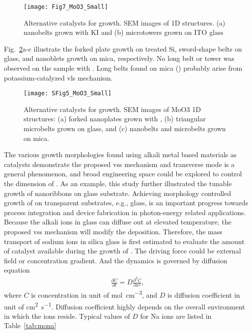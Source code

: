 \begin{figure}[htb]
\centering
\texttt{[image: Fig7\_MoO3\_Small]}
\caption[Alternative catalysts for  growth]{Alternative catalysts for  growth. SEM images of  1D structures. (a) nanobelts grown with KI and (b) microtowers grown on ITO glass}
\label{fig:ch4al1}
\end{figure}

Fig.~\ref{fig:ch4al2}a-c illustrate the forked plate growth on  treated Si, sword-shape belts on glass, and nanoblets growth on mica, respectively. No long belt or tower was observed on the sample with . Long belts found on mica () probably arise from potassium-catalyzed \gls{vls} mechanism.\cite{Hu2011}

\begin{figure}[htb]
\centering
\texttt{[image: SFig5\_MoO3\_Small]}
\caption[Alternative catalysts for  growth cont]{Alternative catalysts for  growth. SEM images of MoO3 1D structures: (a) forked nanoplates grown with , (b) triangular microbelts grown on glass, and (c) nanobelts and microbelts grown on mica.}
\label{fig:ch4al2}
\end{figure}

The various growth morphologies found using alkali metal based materials as catalysts demonstrate the proposed \gls{vss} mechanism and transverse mode is a general phenomenon, and broad engineering space could be explored to control the dimension of . As an example, this study further illustrated the tunable growth of  nanoribbons on glass substrate. Achieving morphology controlled growth of  on transparent substrates, e.g., glass, is an important progress towards process integration and device fabrication in photon-energy related applications. Because the alkali ions in glass can diffuse out at elevated temperature, the proposed \gls{vss} mechanism will modify the  deposition. Therefore, the mass transport of sodium ions in silica glass is first estimated to evaluate the amount of catalyst available during the growth of . The driving force could be external field or concentration gradient. And the dynamics is governed by diffusion equation
\begin{align}\label{eq:nadiff}
\frac{\partial C}{\partial t} = D \frac{\partial^2 C}{\partial x^2},
\end{align}
where $C$ is concentration in unit of \si{mol\per cm^3}, and $D$ is diffusion coefficient in unit of \si{cm^2\per\second}. Diffusion coefficient highly depends on the overall environment in which the ions reside. Typical values of $D$ for Na ions are listed in Table~\ref{tab:mona}

